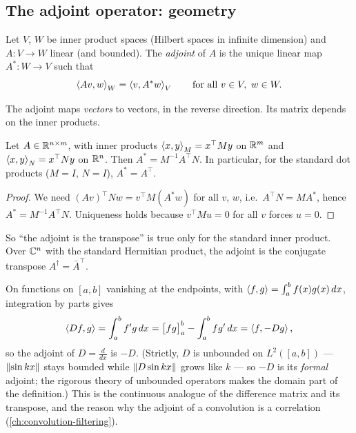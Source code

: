 \begin{notechapter}
\subsection{The adjoint operator: geometry}

\begin{definition}[Adjoint]
Let $V$, $W$ be inner product spaces (Hilbert spaces in infinite dimension) and
$A:V\to W$ linear (and bounded). The \emph{adjoint} of $A$ is the unique linear map
$A^*:W\to V$ such that
\[
  \left\langle Av, w \right\rangle_W = \left\langle v, A^*w \right\rangle_V\qquad\text{for all }v\in V,\ w\in W.
\]
\end{definition}

The adjoint maps \emph{vectors} to vectors, in the reverse direction. Its matrix
depends on the inner products.

\begin{proposition}\label{adjoint-operator:prop:matrix}
Let $A\in\mathbb{R}^{n\times m}$, with inner products $\left\langle x, y \right\rangle_{M} = x^\top My$ on $\mathbb{R}^m$ and
$\left\langle x, y \right\rangle_N = x^\top Ny$ on $\mathbb{R}^n$. Then $A^* = M^{-1}A^\top N$. In particular, for the
standard dot products ($M = I$, $N = I$), $A^* = A^\top$.
\end{proposition}

\begin{proof}
We need $(Av)^\top Nw = v^\top M(A^*w)$ for all $v$, $w$, i.e.\ $A^\top N = MA^*$, hence
$A^* = M^{-1}A^\top N$. Uniqueness holds because $v^\top Mu = 0$ for all $v$ forces $u = 0$.
\end{proof}

So ``the adjoint is the transpose'' is true only for the standard inner product.
Over $\mathbb{C}^n$ with the standard Hermitian product, the adjoint is the conjugate
transpose $A^\dagger = \bar A^\top$.

\begin{example}
On functions on $[a,b]$ vanishing at the endpoints, with $\left\langle f, g \right\rangle = \int_a^bf(x)g(x)\,dx$,
integration by parts gives
\[
  \left\langle Df, g \right\rangle = \int_a^bf'g\,dx = \bigl[fg\bigr]_a^b - \int_a^bfg'\,dx = \left\langle f, -Dg \right\rangle,
\]
so the adjoint of $D = \frac{d}{dx}$ is $-D$. (Strictly, $D$ is unbounded on
$L^2([a,b])$ --- $\left\|\sin kx\right\|$ stays bounded while $\left\|D\sin kx\right\|$ grows like $k$ ---
so $-D$ is its \emph{formal} adjoint; the rigorous theory of unbounded operators makes
the domain part of the definition.) This is the continuous analogue of the
difference matrix and its transpose, and the reason why the adjoint of a
convolution is a correlation (\cref{ch:convolution-filtering}).
\end{example}


\end{notechapter}
